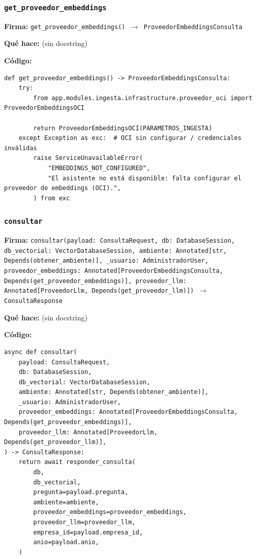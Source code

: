 \documentclass[11pt,a4paper]{article}
\begin{document}
\subsubsection*{\texttt{get\_proveedor\_embeddings}}
\textbf{Firma:} \texttt{get\_proveedor\_embeddings() $\rightarrow$ ProveedorEmbeddingsConsulta}

\textbf{Qué hace:} (sin docstring)

\textbf{Código:}
\begin{lstlisting}
def get_proveedor_embeddings() -> ProveedorEmbeddingsConsulta:
    try:
        from app.modules.ingesta.infrastructure.proveedor_oci import ProveedorEmbeddingsOCI

        return ProveedorEmbeddingsOCI(PARAMETROS_INGESTA)
    except Exception as exc:  # OCI sin configurar / credenciales inválidas
        raise ServiceUnavailableError(
            "EMBEDDINGS_NOT_CONFIGURED",
            "El asistente no está disponible: falta configurar el proveedor de embeddings (OCI).",
        ) from exc
\end{lstlisting}

\subsubsection*{\texttt{consultar}}
\textbf{Firma:} \texttt{consultar(payload: ConsultaRequest, db: DatabaseSession, db\_vectorial: VectorDatabaseSession, ambiente: Annotated[str, Depends(obtener\_ambiente)], \_usuario: AdministradorUser, proveedor\_embeddings: Annotated[ProveedorEmbeddingsConsulta, Depends(get\_proveedor\_embeddings)], proveedor\_llm: Annotated[ProveedorLlm, Depends(get\_proveedor\_llm)]) $\rightarrow$ ConsultaResponse}

\textbf{Qué hace:} (sin docstring)

\textbf{Código:}
\begin{lstlisting}
async def consultar(
    payload: ConsultaRequest,
    db: DatabaseSession,
    db_vectorial: VectorDatabaseSession,
    ambiente: Annotated[str, Depends(obtener_ambiente)],
    _usuario: AdministradorUser,
    proveedor_embeddings: Annotated[ProveedorEmbeddingsConsulta, Depends(get_proveedor_embeddings)],
    proveedor_llm: Annotated[ProveedorLlm, Depends(get_proveedor_llm)],
) -> ConsultaResponse:
    return await responder_consulta(
        db,
        db_vectorial,
        pregunta=payload.pregunta,
        ambiente=ambiente,
        proveedor_embeddings=proveedor_embeddings,
        proveedor_llm=proveedor_llm,
        empresa_id=payload.empresa_id,
        anio=payload.anio,
    )
\end{lstlisting}
\end{document}
